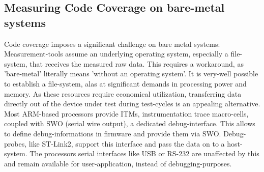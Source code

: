 \documentclass[master,english,smartquotes,apa]{hgbthesis}
\begin{document}
			\subsection{Measuring Code Coverage on bare-metal systems}
			Code coverage imposes a significant challenge on bare metal systems: Measurement-tools assume an underlying operating system, especially a file-system, that receives the measured raw data. This requires a workaround, as 'bare-metal' literally means 'without an operating system'. It is very-well possible to establish a file-system, alas at significant demands in processing power and memory. As these resources require economical utilization, transferring data directly out of the device under test during test-cycles is an appealing alternative. Most ARM-based processors provide ITMs, instrumentation trace macro-cells, coupled with SWO (serial wire output), a dedicated debug-interface. This allows to define debug-informations in firmware and provide them via SWO. Debug-probes, like ST-Link2, support this interface and pass the data on to a host-system. The processors serial interfaces like USB or RS-232 are unaffected by this and remain available for user-application, instead of debugging-purposes. \\
			
\end{document}
